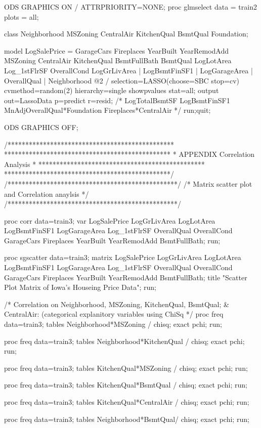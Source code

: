 ODS GRAPHICS ON / ATTRPRIORITY=NONE; 
proc glmselect data = train2 plots = all;  

class Neighborhood MSZoning CentralAir KitchenQual BsmtQual Foundation;

model LogSalePrice =  GarageCars Fireplaces YearBuilt 
YearRemodAdd MSZoning CentralAir KitchenQual BsmtFullBath BsmtQual LogLotArea 
Log_1stFlrSF OverallCond
LogGrLivArea | LogBsmtFinSF1 | LogGarageArea | OverallQual | Neighborhood
@2 / selection=LASSO(choose=SBC stop=cv) cvmethod=random(2) hierarchy=single showpvalues stat=all;
output out=LassoData p=predict r=resid;
/* LogTotalBsmtSF LogBsmtFinSF1 MnAdjOverallQual*Foundation Fireplaces*CentralAir */
run;quit;

ODS GRAPHICS OFF; 

/***********************************************
 ***********************************************
 *         APPENDIX Correlation Analysis       *
 ***********************************************
 ***********************************************/
/************************************************/
/* Matrix scatter plot and Correlation anaylsis */
/************************************************/

proc corr data=train3;
var LogSalePrice LogGrLivArea LogLotArea LogBsmtFinSF1 LogGarageArea Log_1stFlrSF OverallQual OverallCond GarageCars Fireplaces YearBuilt YearRemodAdd BsmtFullBath;
run; 

proc sgscatter data=train3;
matrix LogSalePrice LogGrLivArea LogLotArea LogBsmtFinSF1 LogGarageArea Log_1stFlrSF OverallQual OverallCond GarageCars Fireplaces YearBuilt YearRemodAdd BsmtFullBath;
title "Scatter Plot Matrix of Iowa's Houseing Price Data";
run;
 
/* Correlation on Neighborhood, MSZoning, KitchenQual, BsmtQual; & CentralAir:
	(categorical explanitory variables using ChiSq */
proc freq data=train3;
tables Neighborhood*MSZoning / chisq;
exact pchi;
run;

proc freq data=train3;
tables Neighborhood*KitchenQual / chisq;
exact pchi;
run;

proc freq data=train3;
tables KitchenQual*MSZoning / chisq;
exact pchi;
run;

proc freq data=train3;
tables KitchenQual*BsmtQual / chisq;
exact pchi;
run;

proc freq data=train3;
tables KitchenQual*CentralAir / chisq;
exact pchi;
run;

proc freq data=train3;
tables Neighborhood*BsmtQual/ chisq;
exact pchi;
run;

